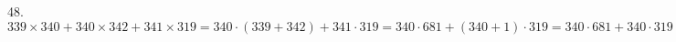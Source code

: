 48. $339 \times 340 + 340 \times 342 + 341 \times 319=
340\cdot(339+342)+341\cdot319=340\cdot681+(340+1)\cdot319=
340\cdot681+340\cdot319+1\cdot319=340\cdot(681+319)+319=
340\cdot1000+319=340319.$
\newpage
